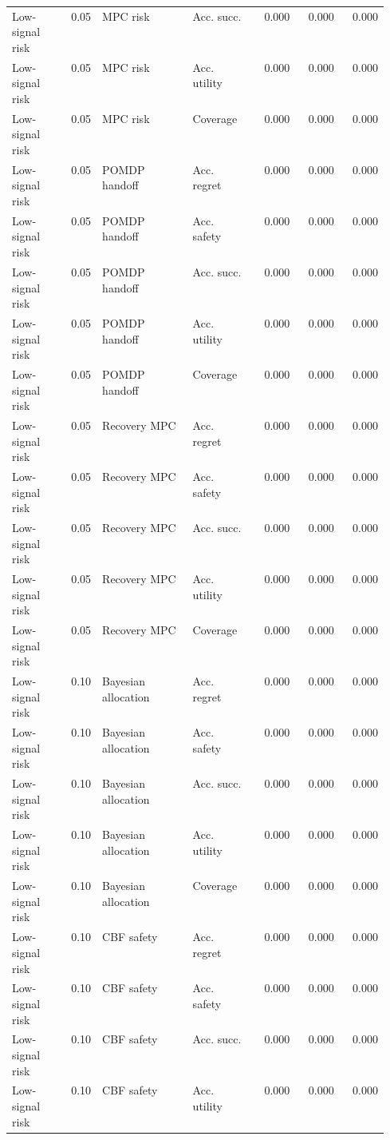 \documentclass{article}
\begin{document}
\begin{center}
\begin{longtable}{p{0.14\linewidth}rp{0.24\linewidth}p{0.17\linewidth}rrr}
Low-signal risk & 0.05 & MPC risk & Acc. succ. & 0.000 & 0.000 & 0.000\\
Low-signal risk & 0.05 & MPC risk & Acc. utility & 0.000 & 0.000 & 0.000\\
Low-signal risk & 0.05 & MPC risk & Coverage & 0.000 & 0.000 & 0.000\\
Low-signal risk & 0.05 & POMDP handoff & Acc. regret & 0.000 & 0.000 & 0.000\\
Low-signal risk & 0.05 & POMDP handoff & Acc. safety & 0.000 & 0.000 & 0.000\\
Low-signal risk & 0.05 & POMDP handoff & Acc. succ. & 0.000 & 0.000 & 0.000\\
Low-signal risk & 0.05 & POMDP handoff & Acc. utility & 0.000 & 0.000 & 0.000\\
Low-signal risk & 0.05 & POMDP handoff & Coverage & 0.000 & 0.000 & 0.000\\
Low-signal risk & 0.05 & Recovery MPC & Acc. regret & 0.000 & 0.000 & 0.000\\
Low-signal risk & 0.05 & Recovery MPC & Acc. safety & 0.000 & 0.000 & 0.000\\
Low-signal risk & 0.05 & Recovery MPC & Acc. succ. & 0.000 & 0.000 & 0.000\\
Low-signal risk & 0.05 & Recovery MPC & Acc. utility & 0.000 & 0.000 & 0.000\\
Low-signal risk & 0.05 & Recovery MPC & Coverage & 0.000 & 0.000 & 0.000\\
Low-signal risk & 0.10 & Bayesian allocation & Acc. regret & 0.000 & 0.000 & 0.000\\
Low-signal risk & 0.10 & Bayesian allocation & Acc. safety & 0.000 & 0.000 & 0.000\\
Low-signal risk & 0.10 & Bayesian allocation & Acc. succ. & 0.000 & 0.000 & 0.000\\
Low-signal risk & 0.10 & Bayesian allocation & Acc. utility & 0.000 & 0.000 & 0.000\\
Low-signal risk & 0.10 & Bayesian allocation & Coverage & 0.000 & 0.000 & 0.000\\
Low-signal risk & 0.10 & CBF safety & Acc. regret & 0.000 & 0.000 & 0.000\\
Low-signal risk & 0.10 & CBF safety & Acc. safety & 0.000 & 0.000 & 0.000\\
Low-signal risk & 0.10 & CBF safety & Acc. succ. & 0.000 & 0.000 & 0.000\\
Low-signal risk & 0.10 & CBF safety & Acc. utility & 0.000 & 0.000 & 0.000\\

\end{longtable}
\end{center}
\end{document}
